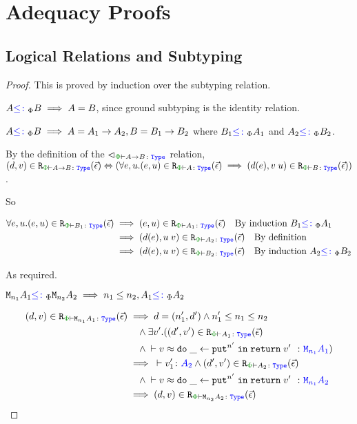 \chapter{Adequacy Proofs}

\section{Logical Relations and Subtyping}
\label{AdequacySubtypingProof}

\begin{framed}
    \begin{proof}
        This is proved by induction over the subtyping relation.
    
        \case{\sground}
        $A{\color{blue} \leq\colon}_\Phi B\implies A = B$, since ground subtyping is the identity relation.
    
    \case{\sfun}
        $A{\color{blue} \leq\colon}_\Phi B\implies A = A_1\rightarrow A_2, B = B_1\rightarrow B_2$ where $B_1{\color{blue} \leq\colon}_\Phi A_1$ and $A_2{\color{blue} \leq\colon}_\Phi B_2$.
    
        By the definition of the $\relates_{\wellformedt{\P}{\ab}}$ relation, $\inLogRelPE{d}{v}{\ab} \Leftrightarrow (\forall e, u. \inLogRelPE{e}{u}{A}\implies \inLogRelPE{d(e)}{\apply{v}{u}}{B})$.
    
        So 
    
        \begin{align*}
            \forall e, u. \inLogRelPE{e}{u}{B_1} & \implies \inLogRelPE{e}{u}{A_1} \qt{By induction $B_1\subtypep A_1$}\\
            & \implies \inLogRelPE{d(e)}{\apply{u}{v}}{A_2}\qt{By definition}\\
            & \implies \inLogRelPE{d(e)}{\apply{u}{v}}{B_2}\qt{By induction $A_2\subtypep B_2$}
        \end{align*}
    
        As required.
    \case{\seffect}
    
    $\texttt{M}_{n_1}{A_1} {\color{blue} \leq\colon}_\Phi \texttt{M}_{n_2}{A_2} \implies n_1\leq n_2, A_1{\color{blue} \leq\colon}_\Phi A_2$
    
    \begin{align*}
        \inLogRelPE{d}{v}{\M{n_1}{A_1}} & \implies  d=(n_1', d') \wedge n_1' \leq n_1\leq n_2 
        \\ & \quad\wedge \exists v'. (\inLogRelPE{d'}{v'}{A_1} 
        \\ & \quad\wedge\zberelation{v}{\doin{\_}{\put^{n'}}{\return{v'}}}{\M{n_1}{A_1}})
        \\
        & \implies \ztyperelation{v_1'}{A_2} \wedge \inLogRelPE{d'}{v'}{A_2} 
        \\ & \quad 
        \wedge \zberelation{v}{\doin{\_}{\put^{n'}}{\return{v'}}}{\M{n_1}{A_2}}
        \\
        & \implies \inLogRelPE{d}{v}{\M{n_2}{A_2}}
    \end{align*}
    

\end{proof}
\end{framed}
